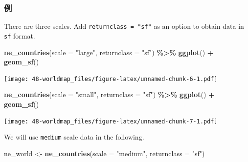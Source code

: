 \documentclass[
  xelatex, ja=standard]{bxjsbook}
\newenvironment{Shaded}{\begin{snugshade}}{\end{snugshade}}
\newcommand{\AttributeTok}[1]{\textcolor[rgb]{0.13,0.29,0.53}{#1}}
\newcommand{\FunctionTok}[1]{\textcolor[rgb]{0.13,0.29,0.53}{\textbf{#1}}}
\newcommand{\NormalTok}[1]{#1}
\newcommand{\OtherTok}[1]{\textcolor[rgb]{0.56,0.35,0.01}{#1}}
\newcommand{\SpecialCharTok}[1]{\textcolor[rgb]{0.81,0.36,0.00}{\textbf{#1}}}
\newcommand{\StringTok}[1]{\textcolor[rgb]{0.31,0.60,0.02}{#1}}
\theoremstyle{definition}
\theoremstyle{definition}
\theoremstyle{definition}
\theoremstyle{definition}
\theoremstyle{remark}
\begin{document}
\hypertarget{ux4f8b-2}{%
\subsubsection{例}\label{ux4f8b-2}}

There are three scales. Add \texttt{returnclass\ =\ "sf"} as an option to obtain data in \texttt{sf} format.

\begin{Shaded}
\begin{Highlighting}[]
\FunctionTok{ne\_countries}\NormalTok{(}\AttributeTok{scale =} \StringTok{"large"}\NormalTok{, }\AttributeTok{returnclass =} \StringTok{"sf"}\NormalTok{) }\SpecialCharTok{\%\textgreater{}\%}
  \FunctionTok{ggplot}\NormalTok{() }\SpecialCharTok{+}   \FunctionTok{geom\_sf}\NormalTok{()}
\end{Highlighting}
\end{Shaded}

\texttt{[image: 48-worldmap\_files/figure-latex/unnamed-chunk-6-1.pdf]}

\begin{Shaded}
\begin{Highlighting}[]
\FunctionTok{ne\_countries}\NormalTok{(}\AttributeTok{scale =} \StringTok{"small"}\NormalTok{, }\AttributeTok{returnclass =} \StringTok{"sf"}\NormalTok{) }\SpecialCharTok{\%\textgreater{}\%}
  \FunctionTok{ggplot}\NormalTok{() }\SpecialCharTok{+}   \FunctionTok{geom\_sf}\NormalTok{()}
\end{Highlighting}
\end{Shaded}

\texttt{[image: 48-worldmap\_files/figure-latex/unnamed-chunk-7-1.pdf]}

We will use \texttt{medium} scale data in the following.

\begin{Shaded}
\begin{Highlighting}[]
\NormalTok{ne\_world }\OtherTok{\textless{}{-}} \FunctionTok{ne\_countries}\NormalTok{(}\AttributeTok{scale =} \StringTok{"medium"}\NormalTok{, }\AttributeTok{returnclass =} \StringTok{"sf"}\NormalTok{)}
\end{Highlighting}
\end{Shaded}
\end{document}
